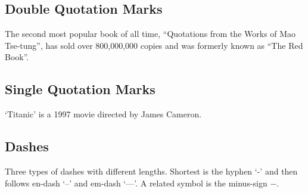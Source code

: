 \documentclass{article}
\begin{document}
\subsection*{Double Quotation Marks}
The second most popular book of all time, ``Quotations from the Works of Mao Tse-tung'', has sold over 800,000,000 copies and was formerly known as ``The Red Book''.

\subsection*{Single Quotation Marks}
`Titanic' is a 1997 movie directed by James Cameron.

\subsection*{Dashes}
Three types of dashes with different lengths. Shortest is the hyphen `-' and then follows en-dash `--' and em-dash `---'. A related symbol is the minus-sign $-$.
\end{document}
